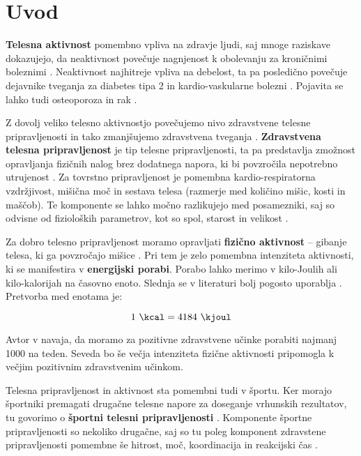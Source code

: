 \chapter{Uvod} \label{uvod}
\textbf{Telesna aktivnost} pomembno vpliva na zdravje ljudi, saj mnoge raziskave dokazujejo, da neaktivnost povečuje nagnjenost k obolevanju za kroničnimi boleznimi \cite{warburton2006health}. Neaktivnost najhitreje vpliva na debelost, ta pa posledično povečuje dejavnike tveganja za diabetes tipa 2 in kardio-vaskularne bolezni \cite{bassuk2005epidemiological}. Pojavita se lahko tudi osteoporoza in rak \cite{warburton2006health}. 

Z dovolj veliko telesno aktivnostjo povečujemo nivo zdravstvene telesne pripravljenosti in tako zmanjšujemo zdravstvena tveganja \cite{caspersen1985physical}. \textbf{Zdravstvena telesna pripravljenost} je tip telesne pripravljenosti, ta pa predstavlja zmožnost opravljanja fizičnih nalog brez dodatnega napora, ki bi povzročila nepotrebno utrujenost \cite{caspersen1985physical}. Za tovrstno pripravljenost je pomembna kardio-respiratorna vzdržjivost, mišična moč in sestava telesa (razmerje med količino mišic, kosti in maščob). Te komponente se lahko močno razlikujejo med posamezniki, saj so odvisne od fizioloških parametrov, kot so spol, starost in velikost \cite{caspersen1985physical}.

Za dobro telesno pripravljenost moramo opravljati \textbf{fizično aktivnost} -- gibanje telesa, ki ga povzročajo mišice \cite{caspersen1985physical}. Pri tem je zelo pomembna intenziteta aktivnosti, ki se manifestira v \textbf{energijski porabi}. Porabo lahko merimo v kilo-Joulih ali kilo-kalorijah na časovno enoto. Slednja se v literaturi bolj pogosto uporablja \cite{caspersen1985physical}. Pretvorba med enotama je: 

\begin{equation} \label{eq:pretvorba}
	1~\mathrm{\si{\kcal}} = 4184~\mathrm{\si{\kjoul}}
\end{equation}


Avtor v \cite{warburton2006health} navaja, da moramo za pozitivne zdravstvene učinke porabiti najmanj \SI{1000}{\kcal} na teden. Seveda bo še večja intenziteta fizične aktivnosti pripomogla k večjim pozitivnim zdravstvenim učinkom.

Telesna pripravljenost in aktivnost sta pomembni tudi v športu. Ker morajo športniki premagati drugačne telesne napore za doseganje vrhunskih rezultatov, tu govorimo o \textbf{športni telesni pripravljenosti} \cite{caspersen1985physical}. Komponente športne pripravljenosti so nekoliko drugačne, saj so tu poleg komponent zdravstene pripravljenosti pomembne še hitrost, moč, koordinacija in reakcijski čas \cite{caspersen1985physical}.

